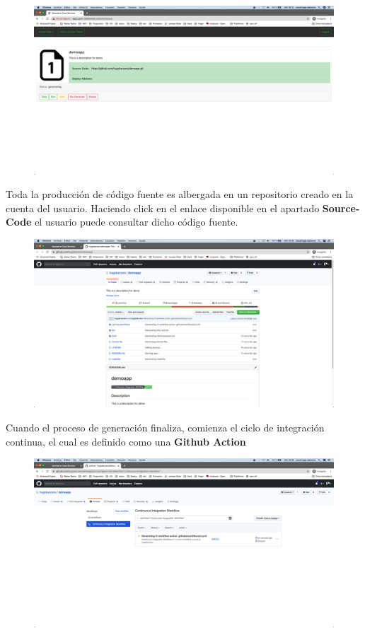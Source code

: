 \documentclass[a4paper,11pt]{book}
\begin{document}
\begin{figure}[H]
\centering
\includegraphics[scale=0.2]{imagenes/casouso/9.png}
\caption{   }
\end{figure}


Toda la producción de código fuente es albergada en un repositorio creado en la cuenta del usuario. Haciendo click en el enlace disponible en el apartado \textbf{Source-Code}
el usuario puede consultar dicho código fuente. 

\begin{figure}[H]
\centering
\includegraphics[scale=0.2]{imagenes/casouso/10.png}
\caption{   }
\end{figure}

Cuando el proceso de generación finaliza, comienza el ciclo de integración continua, el cual es definido como una \textbf{Github Action}

\begin{figure}[H]
\centering
\includegraphics[scale=0.2]{imagenes/casouso/11.png}
\caption{   }
\end{figure}
\end{document}
